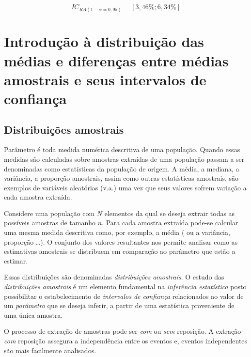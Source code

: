 \documentclass[
]{book}
\begin{document}
\[
IC_{RA (1-\alpha=0,95)} = [3,46\%  ; 6,34\%]
\]

\hypertarget{introduuxe7uxe3o-uxe0-distribuiuxe7uxe3o-das-muxe9dias-e-diferenuxe7as-entre-muxe9dias-amostrais-e-seus-intervalos-de-confianuxe7a}{%
\chapter{Introdução à distribuição das médias e diferenças entre médias amostrais e seus intervalos de confiança}\label{introduuxe7uxe3o-uxe0-distribuiuxe7uxe3o-das-muxe9dias-e-diferenuxe7as-entre-muxe9dias-amostrais-e-seus-intervalos-de-confianuxe7a}}

\hfill\break

\hypertarget{distribuiuxe7uxf5es-amostrais}{%
\section{Distribuições amostrais}\label{distribuiuxe7uxf5es-amostrais}}

\hfill\break

Parâmetro é toda medida numérica descritiva de uma população. Quando essas medidas são calculadas sobre amostras extraídas de uma população passam a ser denominadas como estatísticas da população de origem. A média, a mediana, a variância, a proporção amostrais, assim como outras estatísticas amostrais, são exemplos de variáveis aleatórias (v.a.) uma vez que seus valores sofrem variação a cada amostra extraída.

\hfill\break

Considere uma população com \(N\) elementos da qual se deseja extrair todas as possíveis amostras de tamanho \(n\). Para cada amostra extraída pode-se calcular uma mesma medida descritiva como, por exemplo, a média ( ou a variância, proporção \dots). O conjunto dos valores resultantes nos permite analisar como as estimativas amostrais se distribuem em comparação ao parâmetro que estão a estimar.

\hfill\break

Essas distribuições são denominadas \emph{distribuições amostrais}. O estudo das \emph{distribuições amostrais} é um elemento fundamental na \emph{inferência estatística} posto possibilitar o estabelecimento de \emph{intervalos de confiança} relacionados ao valor de um \emph{parâmetro} que se deseja inferir, a partir de uma estatística proveniente de uma única amostra.

\hfill\break

O processo de extração de amostras pode ser \emph{com} ou \emph{sem} reposição. A extração \emph{com} reposição assegura a independência entre os eventos e, eventos independentes são mais facilmente analisados.
\end{document}
